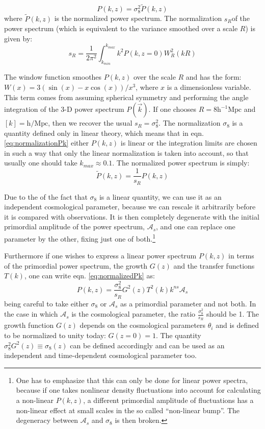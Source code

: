 \begin{equation}
P(k,z)=\sigma_{8}^{2}\tilde{P}(k,z)\label{eq:normalizedPk}
\end{equation}
where $\tilde{P}(k,z)$ is the normalized power spectrum. The normalization
$s_{R}$of the power spectrum (which is equivalent to the variance
smoothed over a scale $R$) is given by:
\begin{equation}
s_{R}=\frac{1}{2\pi^{2}}\int_{k_{min}}^{k_{max}}k^{2}P(k,z=0)W_{R}^{2}(kR)\label{eq:normalizationPk}
\end{equation}


The window function smoothes $P(k,z)$ over the scale $R$ and has
the form: $W(x)=3(\sin(x)-x\cos(x))/x^{3}$, where $x$ is a dimensionless
variable. This term comes from assuming spherical symmetry and performing
the angle integration of the 3-D power spectrum $P(\vec{k})$. If
one chooses $R=8\mbox{h}^{-1}\mbox{Mpc}$ and $[k]=\mbox{h}/\mbox{Mpc}$,
then we recover the usual $s_{R}=\sigma_{8}^{2}$. The normalization
$\sigma_{8}$ is a quantity defined only in linear theory, which means
that in eqn. \ref{eq:normalizationPk} either $P(k,z)$ is linear
or the integration limits are chosen in such a way that only the linear
normalization is taken into account, so that usually one should take
$k_{max}\approx0.1$. The normalized power spectrum is simply: 
\begin{equation}
\tilde{P}(k,z)=\frac{1}{s_{R}}P(k,z)
\end{equation}


Due to the of the fact that $\sigma_{8}$ is a linear quantity, we
can use it as an independent cosmological parameter, because we can
rescale it arbitrarily before it is compared with observations. It
is then completely degenerate with the initial primordial amplitude
of the power spectrum, $\mathcal{A}_{s}$, and one can replace one
parameter by the other, fixing just one of both.\footnote{One has to emphasize that this can only be done for linear power spectra,
because if one takes nonlinear density fluctuations into account for
calculating a non-linear $P(k,z)$, a different primordial amplitude
of fluctuations has a non-linear effect at small scales in the so
called ``non-linear bump''. The degeneracy between $\mathcal{A}_{s}$
and $\sigma_{8}$ is then broken.}

Furthermore if one wishes to express a linear power spectrum $P(k,z)$
in terms of the primordial power spectrum, the growth $G(z)$ and
the transfer functions $T(k)$, one can write eqn. \ref{eq:normalizedPk}
as: 
\begin{equation}
P(k,z)=\frac{\sigma_{8}^{2}}{s_{R}}G^{2}(z)T^{2}(k)k^{ns}\mathcal{A}_{s}
\end{equation}
being careful to take either $\sigma_{8}$ or $\mathcal{A}_{s}$ as
a primordial parameter and not both. In the case in which $\mathcal{A}_{s}$
is the cosmological parameter, the ratio $\frac{\sigma_{8}^{2}}{s_{R}}$
should be 1. The growth function $G(z)$ depends on the cosmological
parameters $\theta_{i}$ and is defined to be normalized to unity
today: $G(z=0)=1$. The quantity $\sigma_{8}^{2}G^{2}(z)\equiv\sigma_{8}(z)$
can be defined accordingly and can be used as an independent and time-dependent
cosmological parameter too. 


